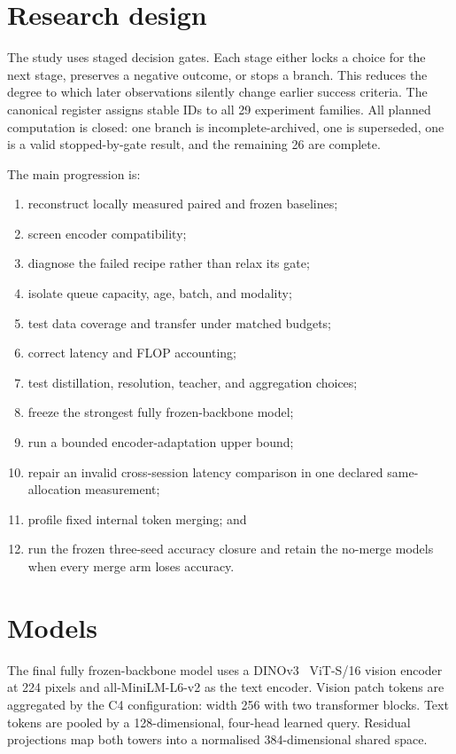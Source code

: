 \section{Research design}
The study uses staged decision gates. Each stage either locks a choice for the next stage, preserves a negative outcome, or stops a branch. This reduces the degree to which later observations silently change earlier success criteria. The canonical register assigns stable IDs to all 29 experiment families. All planned computation is closed: one branch is incomplete-archived, one is superseded, one is a valid stopped-by-gate result, and the remaining 26 are complete.

The main progression is:

\begin{enumerate}
\item reconstruct locally measured paired and frozen baselines;
\item screen encoder compatibility;
\item diagnose the failed recipe rather than relax its gate;
\item isolate queue capacity, age, batch, and modality;
\item test data coverage and transfer under matched budgets;
\item correct latency and FLOP accounting;
\item test distillation, resolution, teacher, and aggregation choices;
\item freeze the strongest fully frozen-backbone model;
\item run a bounded encoder-adaptation upper bound;
\item repair an invalid cross-session latency comparison in one declared same-allocation measurement;
\item profile fixed internal token merging; and
\item run the frozen three-seed accuracy closure and retain the no-merge models when every merge arm loses accuracy.
\end{enumerate}
\section{Models}
The final fully frozen-backbone model uses a DINOv3~\cite{simeoni2025dinov3} ViT-S/16 vision encoder at 224 pixels and all-MiniLM-L6-v2 as the text encoder. Vision patch tokens are aggregated by the C4 configuration: width 256 with two transformer blocks. Text tokens are pooled by a 128-dimensional, four-head learned query. Residual projections map both towers into a normalised 384-dimensional shared space.

